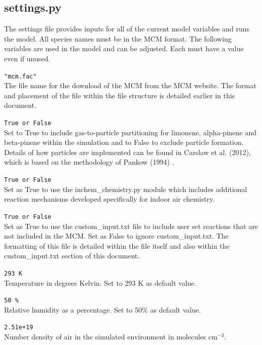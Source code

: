 \documentclass[a4paper]{refart}
\begin{document}
\subsection{settings.py}\label{settings.py}
The settings file provides inputs for all of the current model variables and runs the model. All species names must be in the MCM format. The following variables are used in the model and can be adjusted. Each must have a value even if unused.

\texttt{"mcm.fac"}\\
The file name for the download of the MCM from the MCM website. The format and placement of the file within the file structure is detailed earlier in this document. 

\label{particles}
\texttt{True or False}\\
Set to True to include gas-to-particle partitioning for limonene, alpha-pinene and beta-pinene within the simulation and to False to exclude particle formation. Details of how particles are implemented can be found in Carslaw et al. (2012), which is based on the methodology of Pankow (1994) \cite{Carslaw2012,Pankow1994}.

\texttt{True or False}\\
Set as True to use the inchem\_chemistry.py module which includes additional reaction mechanisms developed specifically for indoor air chemistry. 

\texttt{True or False}\\
Set as True to use the custom\_input.txt file to include user set reactions that are not included in the MCM. Set as False to ignore custom\_input.txt. The formatting of this file is detailed within the file itself and also within the  custom\_input.txt section of this document.

\texttt{293 K}\\
Temperature in degrees Kelvin. Set to 293 K as default value.

\texttt{50 \%}\\
Relative humidity as a percentage. Set to 50\% as default value.

\texttt{2.51e+19}\\
Number density of air in the simulated environment in molecules cm$^{-3}$.
\end{document}
